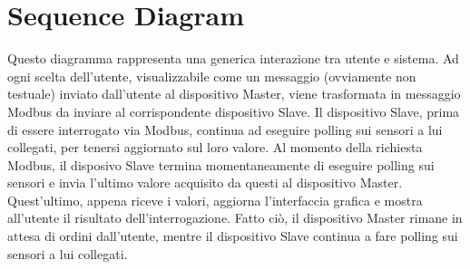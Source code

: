 \documentclass[a4paper,titlepage]{book}
\begin{document}
\newpage

\section{Sequence Diagram}

Questo diagramma rappresenta una generica interazione tra utente e sistema. Ad ogni scelta dell'utente, visualizzabile come un messaggio (ovviamente non testuale) inviato dall'utente al dispositivo Master, viene trasformata in messaggio Modbus da inviare al corrispondente dispositivo Slave. Il dispositivo Slave, prima di essere interrogato via Modbus, continua ad eseguire polling sui sensori a lui collegati, per tenersi aggiornato sul loro valore. Al momento della richiesta Modbus, il disposivo Slave termina momentaneamente di eseguire polling sui sensori e invia l'ultimo valore acquisito da questi al dispositivo Master. Quest'ultimo, appena riceve i valori, aggiorna l'interfaccia grafica e mostra all'utente il risultato dell'interrogazione. Fatto ciò, il dispositivo Master rimane in attesa di ordini dall'utente, mentre il dispositivo Slave continua a fare polling sui sensori a lui collegati.

~
\end{document}
